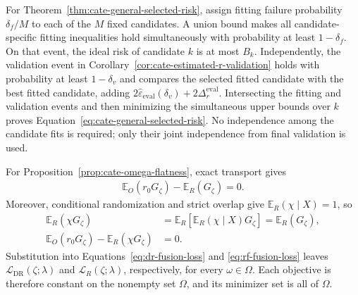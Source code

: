 For Theorem~\ref{thm:cate-general-selected-risk}, assign fitting failure
probability $\delta_f/M$ to each of the $M$ fixed candidates.  A union
bound makes all candidate-specific fitting inequalities hold simultaneously
with probability at least $1-\delta_f$.  On that event, the ideal risk of
candidate $k$ is at most $B_k$.  Independently, the validation event in
Corollary~\ref{cor:cate-estimated-r-validation} holds with probability at
least $1-\delta_v$ and compares the selected fitted candidate with the
best fitted candidate, adding
$2\widehat\varepsilon_{\mathrm{eval}}(\delta_v)
+2\Delta_r^{\mathrm{eval}}$.  Intersecting the fitting and validation events
and then minimizing the simultaneous upper bounds over $k$ proves
Equation~\eqref{eq:cate-general-selected-risk}.  No independence among the
candidate fits is required; only their joint independence from final
validation is used.

For Proposition~\ref{prop:cate-omega-flatness}, exact transport gives
\begin{align*}
\mathbb E_O(r_0G_\zeta)-\mathbb E_R(G_\zeta)=0.
\end{align*}
Moreover, conditional randomization and strict overlap give
$\mathbb E_R(\chi\mid X)=1$, so
\begin{align*}
\mathbb E_R(\chi G_\zeta)
&=\mathbb E_R[\mathbb E_R(\chi\mid X)G_\zeta]
=\mathbb E_R(G_\zeta),\\
\mathbb E_O(r_0G_\zeta)-\mathbb E_R(\chi G_\zeta)
&=0.
\end{align*}
Substitution into Equations~\eqref{eq:dr-fusion-loss} and
\eqref{eq:rf-fusion-loss} leaves
$\mathcal L_{\mathrm{DR}}(\zeta;\lambda)$ and
$\mathcal L_R(\zeta;\lambda)$, respectively, for every
$\omega\in\Omega$.  Each objective is therefore constant on the nonempty
set $\Omega$, and its minimizer set is all of $\Omega$.
